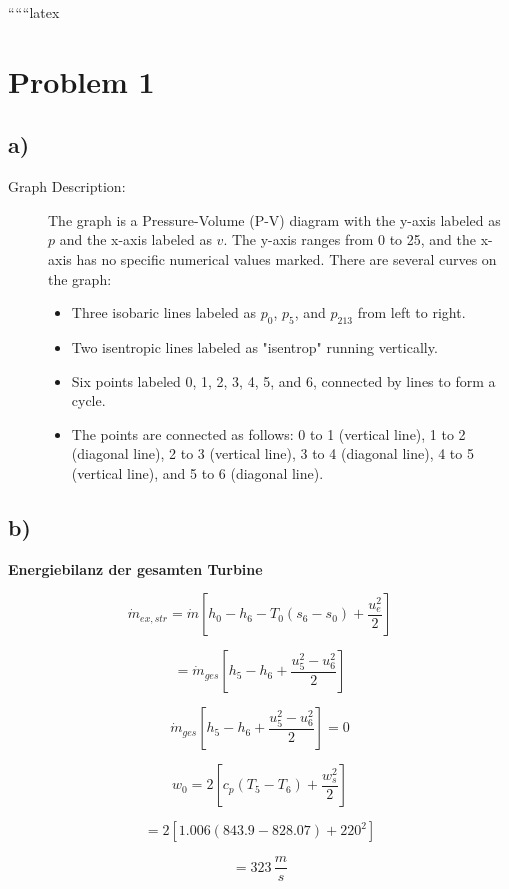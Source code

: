 
``````latex


\section*{Problem 1}

\subsection*{a)}

\begin{description}
    \item[Graph Description:] The graph is a Pressure-Volume (P-V) diagram with the y-axis labeled as $p$ and the x-axis labeled as $v$. The y-axis ranges from 0 to 25, and the x-axis has no specific numerical values marked. There are several curves on the graph:
    \begin{itemize}
        \item Three isobaric lines labeled as $p_0$, $p_5$, and $p_{213}$ from left to right.
        \item Two isentropic lines labeled as "isentrop" running vertically.
        \item Six points labeled 0, 1, 2, 3, 4, 5, and 6, connected by lines to form a cycle.
        \item The points are connected as follows: 0 to 1 (vertical line), 1 to 2 (diagonal line), 2 to 3 (vertical line), 3 to 4 (diagonal line), 4 to 5 (vertical line), and 5 to 6 (diagonal line).
    \end{itemize}
\end{description}

\subsection*{b)}

\textbf{Energiebilanz der gesamten Turbine}

\[
\dot{m}_{ex, str} = \dot{m} \left[ h_0 - h_6 - T_0 (s_6 - s_0) + \frac{u_e^2}{2} \right]
\]

\[
= \dot{m}_{ges} \left[ h_5 - h_6 + \frac{u_5^2 - u_6^2}{2} \right]
\]

\[
\dot{m}_{ges} \left[ h_5 - h_6 + \frac{u_5^2 - u_6^2}{2} \right] = 0
\]

\[
w_0 = 2 \left[ c_p (T_5 - T_6) + \frac{w_s^2}{2} \right]
\]

\[
= 2 \left[ 1.006 \left( 843.9 - 828.07 \right) + 220^2 \right]
\]

\[
= 323 \, \frac{m}{s}
\]


